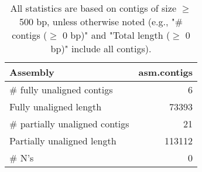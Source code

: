 \documentclass[12pt,a4paper]{article}
\begin{document}
\begin{table}[ht]
\begin{center}
\caption{All statistics are based on contigs of size $\geq$ 500 bp, unless otherwise noted (e.g., "\# contigs ($\geq$ 0 bp)" and "Total length ($\geq$ 0 bp)" include all contigs).}
\begin{tabular}{|l*{1}{|r}|}
\hline
Assembly & asm.contigs \\ \hline
\# fully unaligned contigs & 6 \\ \hline
Fully unaligned length & 73393 \\ \hline
\# partially unaligned contigs & 21 \\ \hline
Partially unaligned length & 113112 \\ \hline
\# N's & 0 \\ \hline
\end{tabular}
\end{center}
\end{table}
\end{document}

